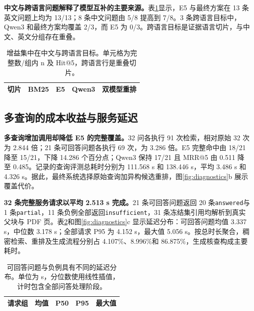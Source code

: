 \textbf{中文与跨语言问题解释了模型互补的主要来源。}表\ref{tab:language}显示，E5 与最终方案在 13 条英文问题上均为 13/13；8 条中文问题由 5/8 提高到 7/8。3 条跨语言目标中，Qwen3 和最终方案均覆盖 2/3，而 E5 为 0/3。跨语言目标是证据语言切片，与中文、英文分组存在重叠。
\begin{table}[!htbp]\centering\small
\caption{增益集中在中文与跨语言目标。单元格为完整数/组内 n 及 Hit@5，跨语言行是重叠切片。}\label{tab:language}
\begin{tabular}{lcccc}\toprule 切片 & BM25 & E5 & Qwen3 & 双模型重排\\\midrule

\end{tabular}
\end{table}

\subsection{多查询的成本收益与服务延迟}
\textbf{多查询增加调用却降低 E5 的完整覆盖。}32 问各执行 91 次检索，相对原始 32 次为 2.844 倍；21 条可回答问题各执行 69 次，为 3.286 倍。E5 完整命中由 18/21 降至 15/21，下降 14.286 个百分点；Qwen3 保持 17/21 且 MRR@5 由 0.511 降至 0.485。记录的查询评测总耗时分别为 111.568 s 和 138.446 s，平均 3.486 s 和 4.326 s。据此，最终系统选择原始查询加异构候选重排，图\ref{fig:diagnostics}b 展示覆盖代价。

\textbf{32 条完整服务请求以平均 2.513 s 完成。}21 条可回答问题返回 20 条\texttt{answered}与 1 条\texttt{partial}，11 条负例全部返回\texttt{insufficient}，31 条冻结集引用均解析到真实父块与 PDF 页。表\ref{tab:latency}和图\ref{fig:diagnostics}c 显示延迟分布：可回答问题均值 3.337 s，中位数 3.178 s；全部请求 P95 为 4.152 s，最大值 5.056 s。按总时长聚合，稠密检索、重排及生成流程分别占 4.107\%、8.996\%和 86.875\%，生成核查构成主要耗时。
\begin{table}[!htbp]\centering\small
\caption{可回答问题与负例具有不同的延迟分布。单位为 s，分位数使用线性插值，计时包含全部问答处理阶段。}\label{tab:latency}
\begin{tabular}{lrrrr}\toprule 请求组 & 均值 & P50 & P95 & 最大值\\\midrule

\end{tabular}
\end{table}


